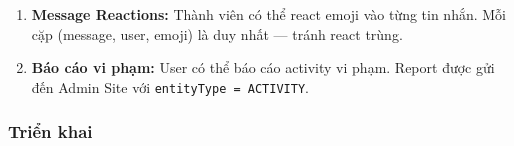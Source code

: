 \documentclass[12pt,a4paper]{article}
\begin{document}
\begin{enumerate}
        chat của activity. Chat đồng bộ realtime qua WebSocket và Redis
        Pub/Sub. Tin nhắn có hai loại: \texttt{TEXT} (người dùng gửi) và
        \texttt{SYSTEM} (thông báo hệ thống như ``User X đã tham gia nhóm'').
  \item \textbf{Message Reactions:} Thành viên có thể react emoji vào từng
        tin nhắn. Mỗi cặp (message, user, emoji) là duy nhất --- tránh react
        trùng.
  \item \textbf{Báo cáo vi phạm:} User có thể báo cáo activity vi phạm.
        Report được gửi đến Admin Site với \texttt{entityType = ACTIVITY}.
\end{enumerate}

\subsubsection{Triển khai}
\end{document}
